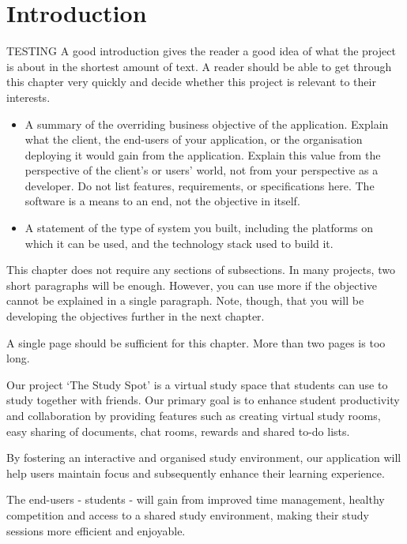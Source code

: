 \chapter{Introduction}
\label{chap:introduction}


\begin{expectations}
TESTING A good introduction gives the reader a good idea of what the project is about in the shortest amount of text.  A reader should be able to get through this chapter very quickly and decide whether this project is relevant to their interests.
\begin{itemize}
\item A summary of the overriding business objective of the application.  Explain what the client, the end-users of your application, or the organisation deploying it would gain from the application.  Explain this value from the perspective of the client's or users' world, not from your perspective as a developer.   Do not list features, requirements, or specifications here.  The software is a means to an end, not the objective in itself.
\item A statement of the type of system you built, including the platforms on which it can be used, and the technology stack used to build it.
\end{itemize}
This chapter does not require any sections of subsections.  In many projects, two short paragraphs will be enough.  However, you can use more if the objective cannot be explained in a single paragraph.  Note, though, that you will be developing the objectives further in the next chapter.

\end{expectations}

\begin{length}
A single page should be sufficient for this chapter.  More than two pages is too long.
\end{length}

 Our project ‘The Study Spot’ is a virtual study space that students can use to study together with friends.
Our primary goal is to enhance student productivity and collaboration by providing features such as creating virtual study rooms, easy sharing of documents, chat rooms, rewards and shared to-do lists. 

By fostering an interactive and organised study environment, our application will help users maintain focus and subsequently enhance their learning experience.

The end-users - students - will gain from improved time management, healthy competition and access to a shared study environment, making their study sessions more efficient and enjoyable. 